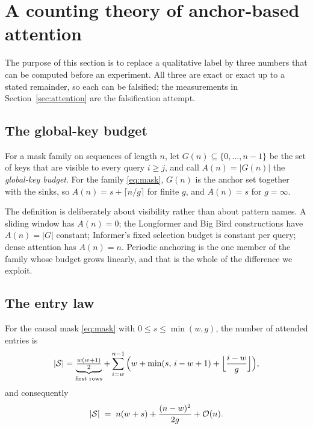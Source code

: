 \section{A counting theory of anchor-based attention}\label{sec:theory}

The purpose of this section is to replace a qualitative label by three numbers
that can be computed before an experiment. All three are exact or exact up to a
stated remainder, so each can be falsified; the measurements in
Section~\ref{sec:attention} are the falsification attempt.

\subsection{The global-key budget}

\begin{definition}\label{def:budget}
For a mask family on sequences of length $n$, let $G(n)\subseteq\{0,\dots,n-1\}$
be the set of keys that are visible to every query $i\ge j$, and call
$A(n)=\lvert G(n)\rvert$ the \emph{global-key budget}. For the family
\eqref{eq:mask}, $G(n)$ is the anchor set together with the sinks, so
$A(n)=s+\lceil n/g\rceil$ for finite $g$, and $A(n)=s$ for $g=\infty$.
\end{definition}

The definition is deliberately about visibility rather than about pattern names.
A sliding window has $A(n)=0$; the Longformer and Big Bird constructions have
$A(n)=\lvert G\rvert$ constant; Informer's fixed selection budget is constant per
query; dense attention has $A(n)=n$. Periodic anchoring is the one member of the
family whose budget grows linearly, and that is the whole of the difference we
exploit.

\subsection{The entry law}

\begin{proposition}\label{prop:count}
For the causal mask \eqref{eq:mask} with $0\le s\le\min(w,g)$, the number
of attended entries is
\begin{equation}
\lvert\mathcal{S}\rvert
= \underbrace{\tfrac{w(w+1)}{2}}_{\text{first rows}}
+ \sum_{i=w}^{n-1}\Big( w + \min(s,\,i-w+1) + \Big\lfloor \frac{i-w}{g}\Big\rfloor \Big),
\label{eq:entrylaw}
\end{equation}
and consequently
\begin{equation}
\lvert\mathcal{S}\rvert \;=\; n(w+s) + \frac{(n-w)^2}{2g} + \mathcal{O}(n).
\label{eq:entryasym}
\end{equation}
\end{proposition}

